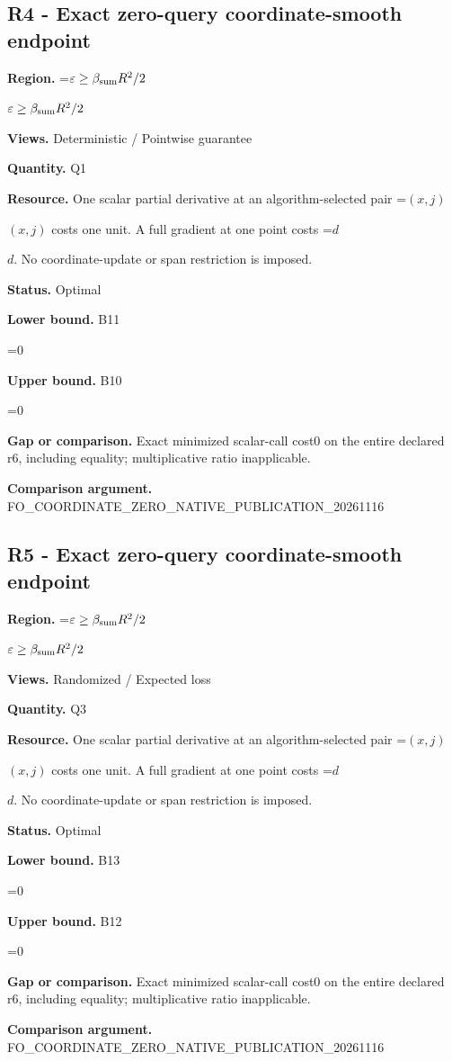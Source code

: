\documentclass[10pt,a4paper]{article}
\newcommand{\AtlasMath}[1]{\par\begingroup\centering\setbox0=\hbox{$\displaystyle #1$}\ifdim\wd0>1.4\linewidth\typeout{ATLAS WIDE FORMULA: \the\wd0}\fi\ifdim\wd0>\linewidth\resizebox{\linewidth}{!}{\box0}\else\box0\fi\par\endgroup}
\newcommand{\AtlasInlineMath}[1]{\begingroup\setbox0=\hbox{$#1$}\ifdim\wd0>.4\linewidth\endgroup\AtlasMath{#1}\else\endgroup$#1$\fi}
\begin{document}
\subsection{R4 - Exact zero-query coordinate-smooth endpoint}
\textbf{Region.} \AtlasInlineMath{\varepsilon\ge\beta_{\rm sum}R^2/2}

\textbf{Views.} Deterministic / Pointwise guarantee

\textbf{Quantity.} Q1

\textbf{Resource.} One scalar partial derivative at an algorithm-selected pair \AtlasInlineMath{(x,j)} costs one unit. A full gradient at one point costs \AtlasInlineMath{d}. No coordinate-update or span restriction is imposed.

\textbf{Status.} Optimal

\textbf{Lower bound.} B11

\AtlasMath{0}
\textbf{Upper bound.} B10

\AtlasMath{0}
\textbf{Gap or comparison.} Exact minimized scalar-call cost0 on the entire declared r6, including equality; multiplicative ratio inapplicable.

\textbf{Comparison argument.} FO\_\allowbreak{}COORDINATE\_\allowbreak{}ZERO\_\allowbreak{}NATIVE\_\allowbreak{}PUBLICATION\_\allowbreak{}20261116

\subsection{R5 - Exact zero-query coordinate-smooth endpoint}
\textbf{Region.} \AtlasInlineMath{\varepsilon\ge\beta_{\rm sum}R^2/2}

\textbf{Views.} Randomized / Expected loss

\textbf{Quantity.} Q3

\textbf{Resource.} One scalar partial derivative at an algorithm-selected pair \AtlasInlineMath{(x,j)} costs one unit. A full gradient at one point costs \AtlasInlineMath{d}. No coordinate-update or span restriction is imposed.

\textbf{Status.} Optimal

\textbf{Lower bound.} B13

\AtlasMath{0}
\textbf{Upper bound.} B12

\AtlasMath{0}
\textbf{Gap or comparison.} Exact minimized scalar-call cost0 on the entire declared r6, including equality; multiplicative ratio inapplicable.

\textbf{Comparison argument.} FO\_\allowbreak{}COORDINATE\_\allowbreak{}ZERO\_\allowbreak{}NATIVE\_\allowbreak{}PUBLICATION\_\allowbreak{}20261116
\end{document}
